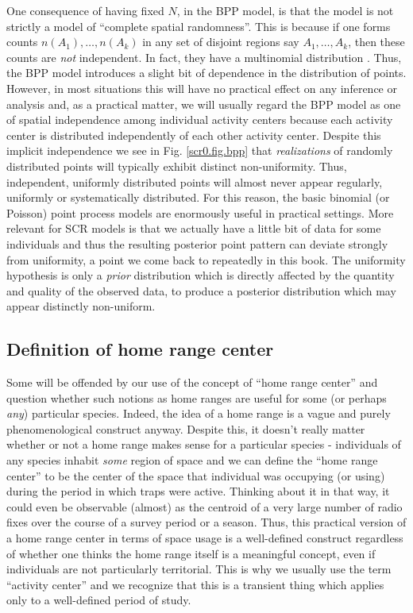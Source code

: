 One consequence of having fixed $N$, in the BPP model, is that the
model is not strictly a model of ``complete spatial randomness''. This
is because if one forms counts $n(A_{1}),\ldots, n(A_{k})$ in any set
of disjoint regions say $A_{1}, \ldots, A_{k}$, then these counts are
{\it not} independent.  In fact, they have a multinomial distribution
\citep[see][p. 61]{illian_etal:2008}. Thus, the BPP model introduces
a slight bit of dependence in the distribution of points. However, in
most situations this will have no practical effect on any inference or
analysis and, as a practical matter, we will usually regard the BPP
model as one of spatial independence among individual activity centers
because each activity center is distributed independently of each
other activity center. Despite this implicit independence we see in
Fig. \ref{scr0.fig.bpp} that {\it realizations} of randomly distributed
points will typically exhibit distinct non-uniformity. Thus,
independent, uniformly distributed points will almost never appear
regularly, uniformly or systematically distributed. For this reason,
the basic binomial (or Poisson) point process models are enormously
useful in practical settings.  More relevant for SCR models is that we
actually have a little bit of data for some individuals and thus the
resulting posterior point pattern can deviate strongly from
uniformity, a point we come back to repeatedly in this book.
The uniformity hypothesis is only
a {\it prior} distribution which is directly affected by the quantity
and quality of the observed data, to produce a posterior distribution which
may appear distinctly non-uniform.


\subsection{Definition of home range center}

Some will be offended by our use of the concept of ``home range
center'' and question whether such notions as home ranges are useful
for some (or perhaps {\it any}) particular species.  Indeed, the idea
of a home range is a vague and purely phenomenological construct
anyway.  Despite this, it doesn't really matter whether or not a home
range makes sense for a particular species - individuals of any
species inhabit {\it some} region of space and we can define the
``home range center'' to be the center of the space that individual
was occupying (or using) during the period in which traps were
active. Thinking about it in that way, it could even be observable
(almost) as the centroid of a very large number of radio fixes over
the course of a survey period or a season.  Thus, this practical
version of a home range center in terms of space usage is a
well-defined construct regardless of whether one thinks the home range
itself is a meaningful concept, even if individuals are not
particularly territorial.  This is why we usually use the term
``activity center'' and we recognize that this is a transient thing
which applies only to a well-defined period of study.


